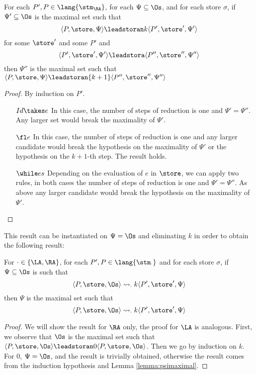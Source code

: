 \begin{lemma}
  \label{lemma:psimaximal}
  For each $P', P\in \lang {\stm_\RA}$, for each $\Psi \subseteq \Os$, and
  for each store $\sigma$,
  if $\Psi' \subseteq \Os$ is the maximal set
  such that
  $$
  \langle P,\store, \Psi \rangle \leadstoran k
  \langle P', \store', \Psi'\rangle
  $$
  for some $\store'$ and some $P'$
  and
  $$
  \langle P',\store', \Psi' \rangle \leadstora
  \langle P'', \store'', \Psi''\rangle
  $$
  then $\Psi''$ is the maximal set such that
  $\langle P,\store, \Psi \rangle \leadstoran {k+1}
  \langle P'', \store'', \Psi''\rangle$
\end{lemma}
\begin{proof}
  By induction on $P'$.
  \begin{itemize}
    \item[$Id\takes e$] In this case, the number of steps of reduction
    is one and $\Psi'=\Psi''$. Any larger set would break
    the maximality of $\Psi'$.
    \item[$\fl e$] In this case, the number of steps of reduction
    is one and any larger candidate would break the hypothesis on the maximality
    of $\Psi'$ or the hypothesis on the $k+1$-th step. The result holds.
    \item[$\while e s$] Depending on the evaluation of $e$ in $\store$,
    we can apply two rules, in both cases the number of steps of
    reduction is one and $\Psi'=\Psi''$. As above any larger candidate would
    break the hypothesis on the maximality
    of $\Psi'$.
  \end{itemize}
\end{proof}

This result can be instantiated on $\Psi=\Os$ and eliminating $k$
in order to obtain the following result:

\begin{cor}
  \label{cor:omaximality}
  For $\cdot \in \{\LA, \RA\}$, for each $P', P\in \lang {\stm_\cdot}$ and
  for each store $\sigma$,
  if $\Psi \subseteq \Os$ is such that
  $$
  \langle P,\store, \Os \rangle \leadsto_\cdot k
  \langle P', \store', \Psi\rangle
  $$
  then $\Psi$ is the maximal set such that
  $$
  \langle P,\store, \Os \rangle \leadsto_\cdot k
  \langle P', \store', \Psi\rangle
  $$
\end{cor}
\begin{proof}
  We will show the result for $\RA$ only, the proof for $\LA$ is analogous.
  First, we observe that $\Os$ is the maximal set such that
  $\langle P, \store, \Os\rangle \leadstoran 0 \langle P, \store, \Os\rangle$.
  Then we go by induction on $k$. For $0$, $\Psi=\Os$, and the result
  is trivially obtained, otherwise the result comes from the
  induction hypothesis and Lemma \ref{lemma:psimaximal}.
\end{proof}

